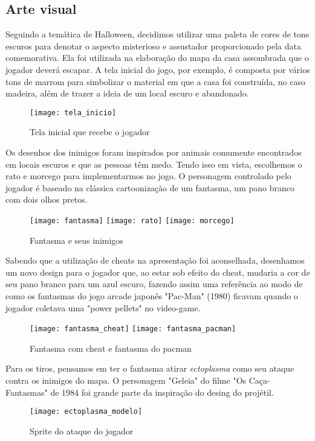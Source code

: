 \documentclass[conference]{IEEEtran}
\begin{document}
\subsection{Arte visual}
Seguindo a temática de Halloween, decidimos utilizar uma paleta de cores de tons escuros para denotar o aspecto misterioso e assustador proporcionado pela data comemorativa. Ela foi utilizada na elaboração do mapa da casa assombrada que o jogador deverá escapar. A tela inicial do jogo, por exemplo, é composta por vários tons de marrom para simbolizar o material em que a casa foi construída, no caso madeira, além de trazer a ideia de um local escuro e abandonado.
\begin{figure}[H]
\centering
\texttt{[image: tela\_inicio]}
\caption{Tela inicial que recebe o jogador}
\end{figure}  

Os desenhos dos inimigos foram inspirados por animais comumente encontrados em locais escuros e que as pessoas têm medo. Tendo isso em vista, escolhemos o rato e morcego para implementarmos no jogo.
O personagem controlado pelo jogador é baseado na clássica cartoonização de um fantasma, um pano branco com dois olhos pretos.

\begin{figure}[H]
\centering
\texttt{[image: fantasma]}
\texttt{[image: rato]}
\texttt{[image: morcego]}
\caption{Fantasma e seus inimigos}
\end{figure}  

Sabendo que a utilização de cheats na apresentação foi aconselhada, desenhamos um novo design para o jogador que, ao estar sob efeito do cheat, mudaria a cor de seu pano branco para um azul escuro, fazendo assim uma referência ao modo de como os fantasmas do jogo arcade japonês "Pac-Man" (1980)\textsuperscript{\cite{b5}} ficavam quando o jogador coletava uma "power pellets" no video-game.
\begin{figure}[H]
\centering
\texttt{[image: fantasma\_cheat]}
\texttt{[image: fantasma\_pacman]}
\caption{Fantasma com cheat e fantasma do pacman}
\end{figure}  

Para os tiros, pensamos em ter o fantasma atirar \emph{ectoplasma} como seu ataque contra os inimigos do mapa. O personagem "Geleia" do filme "Os Caça-Fantasmas" de 1984\textsuperscript{\cite{b6}} foi grande parte da inspiração do desing do projétil.

\begin{figure}[H]
\centering
\texttt{[image: ectoplasma\_modelo]}
\caption{Sprite do ataque do jogador}
\end{figure}  
\end{document}

